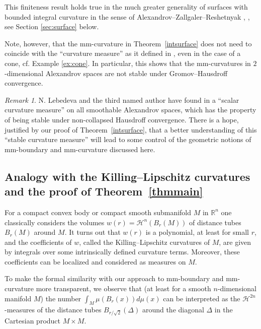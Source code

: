 \documentclass[12pt,leqno]{amsart}
\numberwithin{equation}{section}
\theoremstyle{definition}
\theoremstyle{remark}
\newtheorem{rem}[thm]{Remark}
\newcommand{\tref}[1]{Theorem~\ref{#1}}
\newcommand{\R}{\mathbb{R}}
\begin{document}
This finiteness result holds true in the much greater generality of surfaces  with bounded integral curvature in the sense of Alexandrov--Zallgaler--Reshetnyak \cite{Reshetnyak-GeomIV}, \cite{AZ}, see Section \ref{sec:surface} below.

Note, however, that the mm-curvature
in \tref{intsurface} does not need to coincide with the ``curvature measure'' as it defined in \cite{Reshetnyak-GeomIV},   even in the case of a cone, cf. Example \ref{ex:cone}.  In particular, this shows that the mm-curvatures in $2$-dimensional Alexandrov spaces are not stable under Gromov--Hausdroff convergence.


\begin{rem}
N. Lebedeva and the third named author have found in \cite{LP}  a ``scalar curvature measure'' on all smoothable Alexandrov spaces, which has the property of being stable
under non-collapsed Hausdroff convergence. There is a hope, justified by our proof of  \tref{intsurface}, that a better understanding of this ``stable curvature measure'' will
lead to some control of the geometric notions of mm-boundary and mm-curvature discussed here.
\end{rem}



\subsection{Analogy with the Killing--Lipschitz curvatures and the proof of \tref{thmmain}}
For a compact convex body or compact smooth submanifold $M$ in $\R^n$ one classically considers
the  volumes $w(r)=\mathcal H^n (B_r(M))$ of distance tubes $B_r(M)$ around $M$.
It turns out that $w(r)$ is a polynomial, at least for small $r$, and  the coefficients of
$w$, called the   Killing--Lipschitz curvatures of $M$, are given by  integrals over some intrinsically defined curvature
 terms.  Moreover, these coefficients can be localized and considered as measures on $M$.

To make the formal similarity with our approach  to mm-boundary and mm-curvature more transparent, we observe that
(at least for a smooth $n$-dimensional manifold $M$) the number   $\int _M \mu (B_r(x)) d\mu (x)$  can be interpreted as the $\mathcal H^{2n}$-measures
of the distance tubes $B_{r/\sqrt 2} (\Delta )$ around the diagonal $\Delta $ in the Cartesian product $M\times M$.
\end{document}
